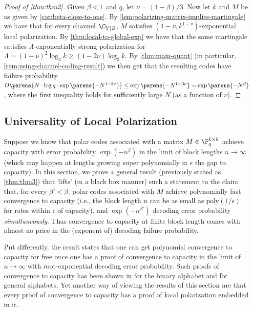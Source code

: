 \documentclass[11pt]{article}
\begin{document}
\begin{proof}[Proof of \cref{thm:thm2}]
	Given $\beta < 1$ and $q$, let $\nu = (1-\beta)/3$. Now let $k$ and $M$ be as given by \cref{cor:beta-close-to-one}. 
	By \cref{lem:polarizing-matrix-implies-martingale}  we have that for every channel $\C_{Y|Z}$, $M$ satisfies $(1-\nu, k^{1-\nu})$-exponential local polarization. By \cref{thm:local-to-global-exp} we have that the same martingale satisfies $\Lambda$-exponentially strong polarization for $\Lambda = (1-\nu)^2 \log_2 k \geq (1-2\nu)\log_2 k$. By \cref{thm:main-quant} (in particular, \cref{rem:using-channel-coding-result}) we then get that the resulting codes have failure probability $O\parens{N \cdot \log q \cdot \exp\parens{-N^{1-2\nu}}} \le \exp\parens{-N^{1-3\nu}} =  \exp\parens{-N^{\beta}}$, where the first inequality holds for sufficiently large $N$ (as a function of $\nu$). 
\end{proof}

\subsection{Universality of Local Polarization}
\label{sec:univ-local-polarization}

Suppose we know that polar codes associated with a matrix $M \in \F_q^{k \times k}$ achieve capacity with error probability $\exp(-n^{\beta})$ in the limit of block lengths $n \to \infty$ (which may happen at lengths growing super polynomially in $\epsilon$ the gap to capacity). In this section, we prove a general result (previously stated as \cref{thm:thm3}) that `lifts' (in a black box manner) such a statement to the claim that, for every $\beta' < \beta$, polar codes associated with $M$ achieve polynomially fast convergence to capacity (i.e., the block length $n$ can be as small as $\mathrm{poly}(1/\epsilon)$ for rates within $\epsilon$ of capacity), and $\exp(-n^{\beta'})$ decoding error probability \emph{simultaneously}. Thus convergence to capacity at finite block length comes with almost no price in the (exponent of) decoding failure probability. 

Put differently, the result states that one can get polynomial convergence to capacity for free once one has a proof of convergence to capacity in the limit of $n \to \infty$ with root-exponential decoding error probability. Such proofs of convergence to capacity has been shown in \cite{KSU10} for the binary alphabet and \cite{mori-tanaka} for general alphabets. 
Yet another way of viewing the results of this section are that every proof of convergence to capacity has a proof of local polarization embedded in it. 
\end{document}
